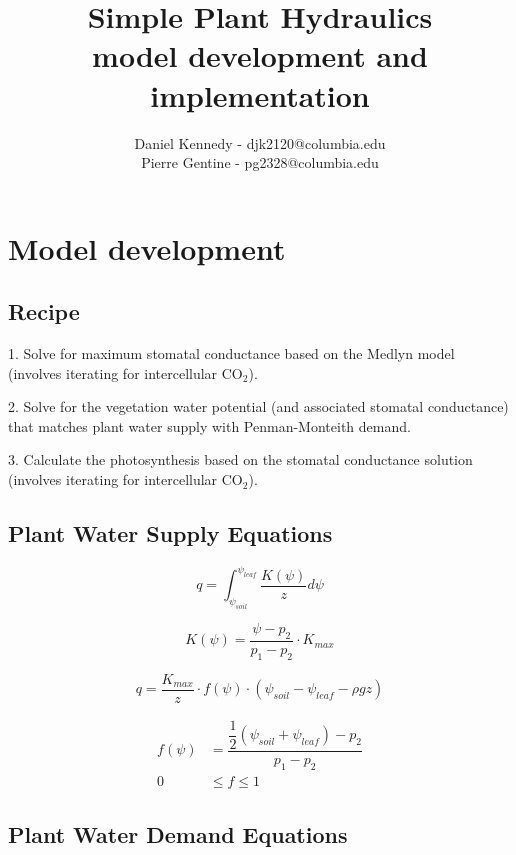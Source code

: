 \documentclass[11pt]{article}
\title{Simple Plant Hydraulics \large \\ model development and implementation}
\author{Daniel Kennedy - djk2120@columbia.edu \\ Pierre Gentine - pg2328@columbia.edu}
\begin{document}
\maketitle

\section{Model development}

\subsection{Recipe}

1. Solve for maximum stomatal conductance based on the Medlyn model (involves iterating for intercellular CO$_2$).

2. Solve for the vegetation water potential (and associated stomatal conductance) that matches plant water supply with Penman-Monteith demand.

3. Calculate the photosynthesis based on the stomatal conductance solution (involves iterating for intercellular CO$_2$).


\subsection{Plant Water Supply Equations}

\begin{equation}
q = \int_{\psi_{soil}}^{\psi_{leaf}}{\dfrac{K\left(\psi\right)}{z}d\psi}
\end{equation}

\begin{equation}
K(\psi) = \dfrac{\psi - p_2}{p_1 - p_2} \cdot K_{max}
\end{equation}

\begin{equation}
q = \dfrac{K_{max}}{z}\cdot f\left(\psi\right) \cdot \left(\psi_{soil}-\psi_{leaf}-\rho g z\right)
\end{equation}

\begin{equation}
\begin{aligned}
f\left(\psi\right) &= \dfrac{\dfrac{1}{2} \left(\psi_{soil}+\psi_{leaf}\right) - p_2}{p_1 - p_2} \\
0 &\leq f \leq 1
\end{aligned}
\end{equation}

\subsection{Plant Water Demand Equations}
\end{document}
